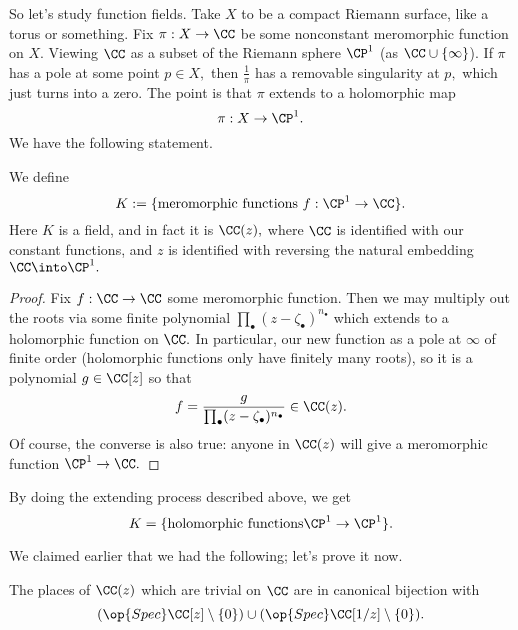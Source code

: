 So let's study function fields. Take $X$ to be a compact Riemann surface, like a torus or something. Fix $\pi:X\to\CC$ be some nonconstant meromorphic function on $X.$ Viewing $\CC$ as a subset of the Riemann sphere $\CP^1$ (as $\CC\cup\{\infty\}$). If $\pi$ has a pole at some point $p\in X,$ then $\frac1\pi$ has a removable singularity at $p,$ which just turns into a zero. The point is that $\pi$ extends to a holomorphic map
\[\pi:X\to\CP^1.\]
We have the following statement.
\begin{proposition}
	We define
	\[K:=\{\text{meromorphic functions }f:\CP^1\to\CC\}.\]
	Here $K$ is a field, and in fact it is $\CC(z),$ where $\CC$ is identified with our constant functions, and $z$ is identified with reversing the natural embedding $\CC\into\CP^1.$
\end{proposition}
\begin{proof}
	Fix $f:\CC\to\CC$ some meromorphic function. Then we may multiply out the roots via some finite polynomial $\prod_\bullet(z-\zeta_\bullet)^{n_\bullet}$ which extends to a holomorphic function on $\CC.$ In particular, our new function as a pole at $\infty$ of finite order (holomorphic functions only have finitely many roots), so it is a polynomial $g\in\CC[z]$ so that
	\[f=\frac g{\prod_\bullet(z-\zeta_\bullet)^{n_\bullet}}\in\CC(z).\]
	Of course, the converse is also true: anyone in $\CC(z)$ will give a meromorphic function $\CP^1\to\CC.$
\end{proof}
\begin{remark}
	By doing the extending process described above, we get
	\[K=\{\text{holomorphic functions}\CP^1\to\CP^1\}.\]
\end{remark}
We claimed earlier that we had the following; let's prove it now.
\begin{proposition}
	The places of $\CC(z)$ which are trivial on $\CC$ are in canonical bijection with
	\[(\op{Spec}\CC[z]\setminus\{0\})\cup(\op{Spec}\CC[1/z]\setminus\{0\}).\]
\end{proposition}
